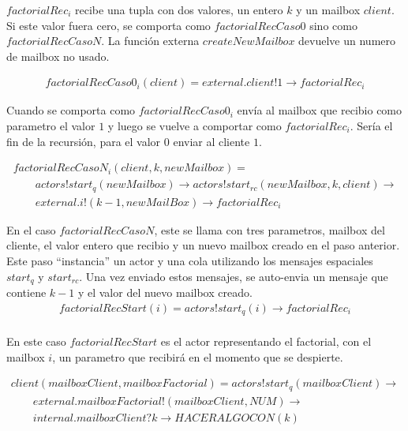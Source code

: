 \documentclass[fleqn]{article}
\begin{document}
$factorialRec_i$ recibe una tupla con dos valores, un entero $k$ y un mailbox $client$. Si este valor fuera cero, se comporta como $factorialRecCaso0$ sino como $factorialRecCasoN$.
La función externa $createNewMailbox$ devuelve un numero de mailbox no usado. 

\begin{gather*}
factorialRecCaso0_i(client) = external.client!1 \rightarrow factorialRec_i 
\end{gather*}

Cuando se comporta como $factorialRecCaso0_i$ envía al mailbox que recibio como parametro el valor $1$ y luego se vuelve a comportar como $factorialRec_i$. Sería el fin de la recursión, para el valor $0$ enviar al cliente $1$.

\begin{gather*}
factorialRecCasoN_i(client,k, newMailbox) = \\
  \qquad actors!start_q(newMailbox) \rightarrow actors!start_{rc}(newMailbox, k, client) \rightarrow \\
  \qquad external.i!(k - 1, newMailBox) \rightarrow factorialRec_i
\end{gather*}

En el caso $factorialRecCasoN$, este se llama con tres parametros, mailbox del cliente, el valor entero que recibio y un nuevo mailbox creado en el paso anterior. Este paso ``instancia'' un actor y una cola utilizando los mensajes espaciales $start_q$ y $start_{rc}$. Una vez enviado estos mensajes, se auto-envia un mensaje que contiene $k - 1$ y el valor del nuevo mailbox creado.\\

\begin{gather*}
factorialRecStart(i) = actors!start_q(i) \rightarrow factorialRec_i \\
\end{gather*}

En este caso $factorialRecStart$ es el actor representando el factorial, con el mailbox $i$, un parametro que recibirá en el momento que se despierte.

\begin{gather*}
client(mailboxClient, mailboxFactorial) =  actors!start_q(mailboxClient) \rightarrow  \\
\qquad  external.mailboxFactorial!(mailboxClient,NUM) \rightarrow \\
\qquad internal.mailboxClient?k \rightarrow HACERALGOCON(k) 
\end{gather*}
\end{document}
